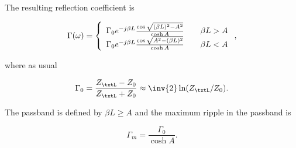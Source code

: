 The resulting reflection coefficient is

\begin{equation}\label{eqn:continuumAndOtherTransformersCore:1080}
\Gamma(\omega)
=
\left\{
\begin{array}{l l}
\Gamma_0 e^{-j \beta L} \frac{\cos\sqrt{(\beta L)^2 - A^2}}{\cosh A} & \quad \mbox{\( \beta L > A \)} \\
\Gamma_0 e^{-j \beta L} \frac{\cos\sqrt{A^2 - (\beta L)^2 }}{\cosh A} & \quad \mbox{\( \beta L < A \)} \\
\end{array}
\right.,
\end{equation}

where as usual

\begin{equation}\label{eqn:continuumAndOtherTransformersCore:1100}
\Gamma_0 = \frac{Z_\txtL - Z_0}{Z_\txtL + Z_0} \approx \inv{2} \ln (Z_\txtL/Z_0).
\end{equation}

The passband is defined by \( \beta L \ge A \) and the maximum ripple in the passband is

\begin{equation}\label{eqn:continuumAndOtherTransformersCore:1120}
\Gamma_m = \frac{\Gamma_0}{\cosh A}.
\end{equation}

